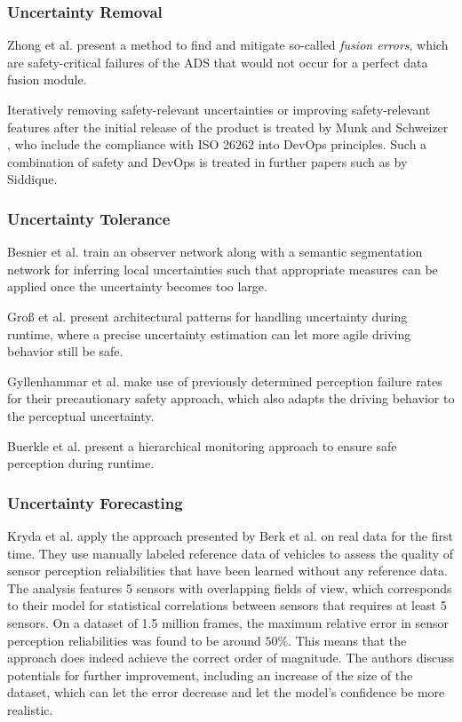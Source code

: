 \documentclass[conference]{IEEEtran}
\newcommand{\citeold}[1]{{\hypersetup{citecolor=black}\cite{#1}}}
\begin{document}
\subsubsection{Uncertainty Removal}
\label{sec:uncertainty_removal}

Zhong et al. \cite{Zhong2021detecting} present a method to find and mitigate so-called \textit{fusion errors}, which are safety-critical failures of the ADS that would not occur for a perfect data fusion module.

Iteratively removing safety-relevant uncertainties or improving safety-relevant features after the initial release of the product is treated by Munk and Schweizer \cite{Munk2022safeops}, who include the compliance with ISO 26262 into DevOps principles.
Such a combination of safety and DevOps is treated in further papers such as \cite{Siddique2020} by Siddique.


\subsubsection{Uncertainty Tolerance}
\label{sec:uncertainty_tolerance}

Besnier et al. \cite{Besnier2021uncertainty} train an observer network along with a semantic segmentation network for inferring local uncertainties such that appropriate measures can be applied once the uncertainty becomes too large.

Groß et al. \cite{Gross2022architectural} present architectural patterns for handling uncertainty during runtime, where a precise uncertainty estimation can let more agile driving behavior still be safe.

Gyllenhammar et al. \cite{Gyllenhammar2022uncertainty} make use of previously determined perception failure rates for their precautionary safety approach, which also adapts the driving behavior to the perceptual uncertainty. 


Buerkle et al. \cite{Buerkle2022safe} present a hierarchical monitoring approach to ensure safe perception during runtime.

\subsubsection{Uncertainty Forecasting}
\label{sec:uncertainty_forecasting}

Kryda et al. \cite{Kryda2021} apply the approach presented by Berk et al. \citeold{berk2019exploiting} on real data for the first time. 
They use manually labeled reference data of vehicles to assess the quality of sensor perception reliabilities that have been learned without any reference data. 
The analysis features 5 sensors with overlapping fields of view, which corresponds to their model for statistical correlations between sensors that requires at least 5 sensors.
On a dataset of 1.5 million frames, the maximum relative error in sensor perception reliabilities was found to be around $50\%$.
This means that the approach does indeed achieve the correct order of magnitude. 
The authors discuss potentials for further improvement, including an increase of the size of the dataset, which can let the error decrease and let the model's confidence be more realistic. 
\end{document}
